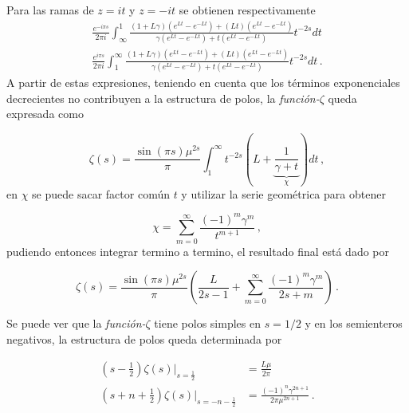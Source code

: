 Para las ramas de $z= i t$ y $z=- i t$ se obtienen respectivamente
\begin{equation}\label{eq.tirados}
\begin{aligned}
\frac{e ^{-i \pi s}}{2 \pi i} \int _{\infty} ^{1} 
	\frac{(1+L \gamma) \left( e^{L t} - e ^{- L t} \right) +
			(L t) \left( e ^{L t} - e^{- L t} \right)
			}
			{\gamma \left( e ^{L t} - e ^{- L t} \right) + 
			t \left( e ^{L t} - e ^{-L t} \right)}
			t ^{-2s} dt \\[7pt]
\frac{e ^{i \pi s}}{2 \pi i} \int _{1} ^{\infty} 
	\frac{(1+L \gamma) \left( e^{L t} - e ^{- L t} \right) +
			(L t) \left( e ^{L t} - e^{- L t} \right)
			}
			{\gamma \left( e ^{L t} - e ^{- L t} \right) + 
			t \left( e ^{L t} - e ^{-L t} \right)}
			t ^{-2s} dt
			\, .
\end{aligned}
\end{equation}
A partir de estas expresiones, teniendo en cuenta que los términos exponenciales decrecientes no contribuyen a la estructura de polos, la {\it función-$\zeta$} queda expresada como

\begin{equation}
	\zeta  (s) = 
    \frac{ \sin (\pi s) \mu ^{2s}}{ \pi } 
    \int _1 ^{\infty} 
    t^{-2s}
    \left(
    	L + 
	    \underbrace
    	{
		\frac{1}{\gamma + t}   
		} _{\chi} 
	\right)
    dt  \,  ,
\label{contorno}
\end{equation}
en $\chi$ se puede sacar factor común $t$ y utilizar la serie geométrica para obtener

\begin{equation}
    \chi =   \sum _{m=0} ^{\infty} \frac{(-1) ^{m} \gamma ^{m} }{t ^{m+1}}
    \, ,
\label{eq:chi}
\end{equation}
pudiendo entonces integrar termino a termino, el resultado final está dado por

\begin{equation}
    \zeta  (s) = 
    \frac{ \sin(\pi s) \mu ^{2s }}{\pi } 
    \left(
    \frac{L}{2s-1} + 
    \sum _{m=0} ^{\infty}
    \frac{(-1) ^{m} \gamma ^{m} }{2s+m}
    \right) \, .
\label{eq.zeta.com}
\end{equation}

Se puede ver que la {\it función-$\zeta$} tiene polos simples en $s=1/2$ y en los semienteros negativos, la estructura de polos queda determinada por

\begin{equation}
\begin{aligned}
\left(s-\frac{1}{2} \right) \zeta(s) |_{s=\frac{1}{2}} &= \frac{L \mu }{2 \pi}   \\
\left( s + n + \frac{1}{2} \right)
\zeta (s ) |_{s= -n - \frac{1}{2}}  &= \frac{ (-1) ^n \gamma ^{2n+1}  }{2 \pi \mu ^{2n + 1}} 
\, .
\end{aligned}
\label{eq.polos.complejo}
\end{equation}


